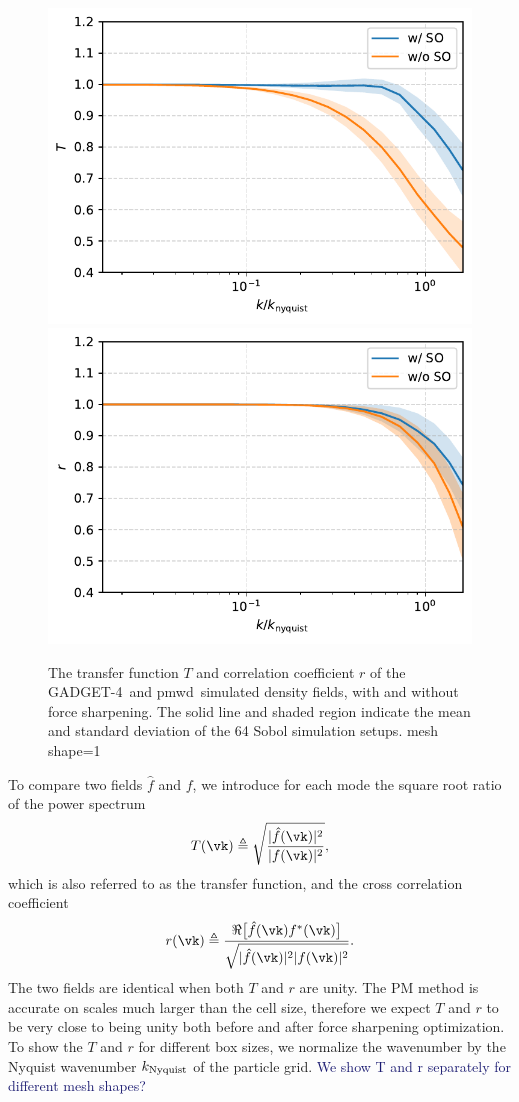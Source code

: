 \documentclass[modern, trackchanges, dvipsnames]{aastex631}
\newcommand{\pmwd}{{\usefont{T1}{nova}{m}{sl}pmwd}}
\newcommand{\GADGET}{{{\fontsize{10pt}{12pt}\selectfont GADGET}-4}}
\newcommand{\YZ}[1]{\textcolor{MidnightBlue}{#1}}
\begin{document}
\begin{figure}
  \centering
  \includegraphics[width=.8\columnwidth]{tf_snap120_3063821_e888.pdf} \\
  \includegraphics[width=.8\columnwidth]{cc_snap120_3063821_e888.pdf}
  \caption{The transfer function $T$ and correlation coefficient $r$ of the
  \GADGET\ and \pmwd\ simulated density fields, with and without force
  sharpening. The solid line and shaded region indicate the mean and standard
  deviation of the 64 Sobol simulation setups. mesh shape=1}
  \label{fig:tfcc}
\end{figure}

To compare two fields $\hat f$ and $f$, we introduce for each mode the square
root ratio of the power spectrum
%
\begin{equation}
T(\vk) \triangleq
\sqrt{\frac{|\hat f(\vk)|^2}{|f(\vk)|^2}},
\label{T}
\end{equation}
%
which is also referred to as the transfer function, and the cross correlation
coefficient
%
\begin{equation}
r(\vk) \triangleq
\frac{\Re \bigl[ \hat f(\vk) f^*(\vk) \bigr]}
     {\sqrt{|\hat f(\vk)|^2 |f(\vk)|^2}}.
\label{r}
\end{equation}
%
The two fields are identical when both $T$ and $r$ are unity.
The PM method is accurate on scales much larger than the cell size, therefore we
expect $T$ and $r$ to be very close to being unity both before and after force
sharpening optimization.
To show the $T$ and $r$ for different box sizes, we normalize the wavenumber by
the Nyquist wavenumber $k_{\rm Nyquist}$ of the particle grid.
\YZ{We show T and r separately for different mesh shapes?}
\end{document}

